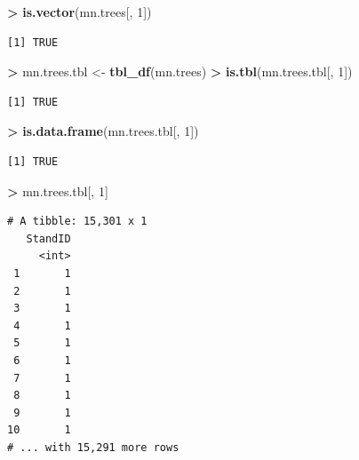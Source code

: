 \documentclass[]{krantz}
\makeatletter
\newenvironment{Shaded}{\begin{snugshade}}{\end{snugshade}}
\newcommand{\DecValTok}[1]{\textcolor[rgb]{0.06,0.06,0.06}{#1}}
\newcommand{\KeywordTok}[1]{\textcolor[rgb]{0.27,0.27,0.27}{\textbf{#1}}}
\newcommand{\NormalTok}[1]{#1}
\newcommand{\OperatorTok}[1]{\textcolor[rgb]{0.43,0.43,0.43}{\textbf{#1}}}
\newcommand{\StringTok}[1]{\textcolor[rgb]{0.5,0.5,0.5}{#1}}
\newenvironment{kframe}{%
\medskip{}
\setlength{\fboxsep}{.8em}
 \def\at@end@of@kframe{}%
 \ifinner\ifhmode%
  \def\at@end@of@kframe{\end{minipage}}%
  \begin{minipage}{\columnwidth}%
 \fi\fi%
 \def\FrameCommand##1{\hskip\@totalleftmargin \hskip-\fboxsep
 \colorbox{shadecolor}{##1}\hskip-\fboxsep
     \hskip-\linewidth \hskip-\@totalleftmargin \hskip\columnwidth}%
 \MakeFramed {\advance\hsize-\width
   \@totalleftmargin\z@ \linewidth\hsize
   \@setminipage}}%
 {\par\unskip\endMakeFramed%
 \at@end@of@kframe}
\renewenvironment{Shaded}{\begin{kframe}}{\end{kframe}}
\makeatother
\begin{document}
\begin{Shaded}
\begin{Highlighting}[]
\OperatorTok{>}\StringTok{ }\KeywordTok{is.vector}\NormalTok{(mn.trees[, }\DecValTok{1}\NormalTok{])}
\end{Highlighting}
\end{Shaded}

\begin{verbatim}
[1] TRUE
\end{verbatim}

\begin{Shaded}
\begin{Highlighting}[]
\OperatorTok{>}\StringTok{ }\NormalTok{mn.trees.tbl <-}\StringTok{ }\KeywordTok{tbl_df}\NormalTok{(mn.trees)}
\OperatorTok{>}\StringTok{ }\KeywordTok{is.tbl}\NormalTok{(mn.trees.tbl[, }\DecValTok{1}\NormalTok{])}
\end{Highlighting}
\end{Shaded}

\begin{verbatim}
[1] TRUE
\end{verbatim}

\begin{Shaded}
\begin{Highlighting}[]
\OperatorTok{>}\StringTok{ }\KeywordTok{is.data.frame}\NormalTok{(mn.trees.tbl[, }\DecValTok{1}\NormalTok{])}
\end{Highlighting}
\end{Shaded}

\begin{verbatim}
[1] TRUE
\end{verbatim}

\begin{Shaded}
\begin{Highlighting}[]
\OperatorTok{>}\StringTok{ }\NormalTok{mn.trees.tbl[, }\DecValTok{1}\NormalTok{]}
\end{Highlighting}
\end{Shaded}

\begin{verbatim}
# A tibble: 15,301 x 1
   StandID
     <int>
 1       1
 2       1
 3       1
 4       1
 5       1
 6       1
 7       1
 8       1
 9       1
10       1
# ... with 15,291 more rows
\end{verbatim}
\end{document}
